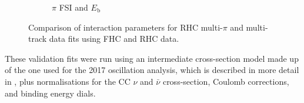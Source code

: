 \begin{figure}[t]
\begin{subfigure}{0.49\textwidth}
  \caption{$\pi$ FSI and $E_{\mathrm{b}}$}
\end{subfigure}
\caption{Comparison of interaction parameters for RHC multi-$\pi$ and multi-track data fits using FHC and RHC data.}
\label{fig:rhcmpidat28xsec}
\end{figure}

These validation fits were run using an intermediate cross-section model made up of the one used for the 2017 oscillation analysis, which is described in more detail in \cite{tn315}, plus normalisations for the CC $\nu$ and $\bar{\nu}$ cross-section, Coulomb corrections, and binding energy dials. 

\newpage
